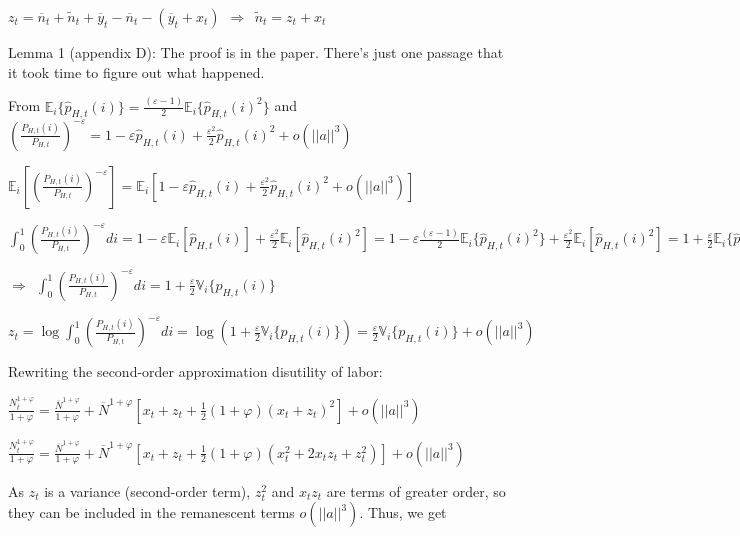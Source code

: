 \documentclass[
]{article}
\begin{document}
\(z_t=\overline{n}_t+\widetilde{n}_t+\overline{y}_t-\overline{n}_t-(\overline{y}_t+x_t) \ \ \Rightarrow \ \ \widetilde{n}_t=z_t+x_t\)

Lemma 1 (appendix D): The proof is in the paper. There's just one
passage that it took time to figure out what happened.

From
\(\displaystyle \mathbb{E}_i \{ \widehat{p}_{H,t}(i)\} = \frac{(\varepsilon-1)}{2}\mathbb{E}_i \{ \widehat{p}_{H,t}(i)^2\}\)
and
\(\displaystyle \left(\frac{P_{H,t}(i)}{P_{H,t}} \right)^{-\varepsilon}=1-\varepsilon \widehat{p}_{H,t}(i)+ \frac{\varepsilon^2}{2} \widehat{p}_{H,t}(i)^2+o(||a||^3)\)

\(\displaystyle \mathbb{E}_i\left[ \left(\frac{P_{H,t}(i)}{P_{H,t}} \right)^{-\varepsilon} \right]= \mathbb{E}_i \left[ 1-\varepsilon \widehat{p}_{H,t}(i)+ \frac{\varepsilon^2}{2} \widehat{p}_{H,t}(i)^2+o(||a||^3) \right]\)

\(\displaystyle \int_0^1 \left(\frac{P_{H,t}(i)}{P_{H,t}} \right)^{-\varepsilon} di= 1-\varepsilon \mathbb{E}_i[\widehat{p}_{H,t}(i)]+ \frac{\varepsilon^2}{2} \mathbb{E}_i[\widehat{p}_{H,t}(i)^2]=1-\varepsilon \frac{(\varepsilon-1)}{2}\mathbb{E}_i \{ \widehat{p}_{H,t}(i)^2\} + \frac{\varepsilon^2}{2} \mathbb{E}_i[\widehat{p}_{H,t}(i)^2]=1+\frac{\varepsilon}{2}\mathbb{E}_i \{ \widehat{p}_{H,t}(i)^2\}\)

\(\Rightarrow \ \ \displaystyle \int_0^1 \left(\frac{P_{H,t}(i)}{P_{H,t}} \right)^{-\varepsilon} di=1+\frac{\varepsilon}{2}\mathbb{V}_i\{p_{H,t}(i)\}\)

\(\displaystyle z_t= \log \int_0^1 \left(\frac{P_{H,t}(i)}{P_{H,t}} \right)^{-\varepsilon} di = \log \left( 1+\frac{\varepsilon}{2}\mathbb{V}_i\{p_{H,t}(i)\} \right)= \frac{\varepsilon}{2}\mathbb{V}_i\{p_{H,t}(i)\} +o(||a||^3)\)

Rewriting the second-order approximation disutility of labor:

\(\displaystyle \frac{N_t^{1+\varphi}}{1+\varphi} = \frac{\overline{N}^{1+\varphi}}{1+\varphi} +\overline{N}^{1+\varphi}\left[ x_t+z_t + \frac{1}{2}(1+\varphi)(x_t+z_t)^2 \right] + o(||a||^3)\)

\(\displaystyle \frac{N_t^{1+\varphi}}{1+\varphi} = \frac{\overline{N}^{1+\varphi}}{1+\varphi} +\overline{N}^{1+\varphi}\left[ x_t+z_t + \frac{1}{2}(1+\varphi)(x_t^2+2 x_tz_t + z_t^2) \right] + o(||a||^3)\)

As \(z_t\) is a variance (second-order term), \(z_t^2\) and \(x_t z_t\)
are terms of greater order, so they can be included in the remanescent
terms \(o(||a||^3)\). Thus, we get
\end{document}
